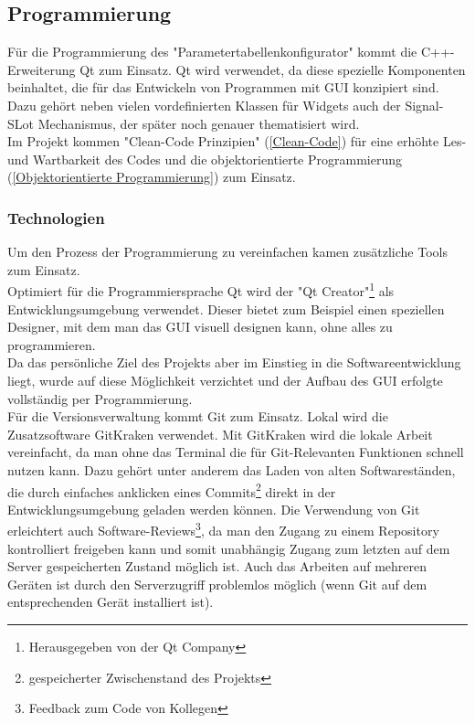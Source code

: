 \documentclass[a4paper,12pt,top=2.5cm,bottom=2.5cm, left=2.5cm, right=2.5cm, numbers=noenddot]{scrartcl}
\begin{document}
\subsection{Programmierung}
Für die Programmierung des "Parametertabellenkonfigurator" kommt die C++-Erweiterung Qt zum Einsatz. Qt wird verwendet, da diese spezielle Komponenten beinhaltet, die für das Entwickeln von Programmen mit GUI konzipiert sind. Dazu gehört neben vielen vordefinierten Klassen für Widgets auch der Signal-SLot Mechanismus, der später noch genauer thematisiert wird.\\
Im Projekt kommen "Clean-Code Prinzipien" (\ref{Clean-Code}) für eine erhöhte Les- und Wartbarkeit des Codes und die objektorientierte Programmierung (\ref{Objektorientierte Programmierung}) zum Einsatz.
\subsubsection{Technologien} 
Um den Prozess der Programmierung zu vereinfachen kamen zusätzliche Tools zum Einsatz. \\
Optimiert für die Programmiersprache Qt wird der "Qt Creator"\footnote{Herausgegeben von der Qt Company} als Entwicklungsumgebung verwendet. Dieser bietet zum Beispiel einen speziellen Designer, mit dem man das GUI visuell designen kann, ohne alles zu programmieren. \\
Da das persönliche Ziel des Projekts aber im Einstieg in die Softwareentwicklung liegt, wurde auf diese Möglichkeit verzichtet und der Aufbau des GUI erfolgte vollständig per Programmierung. \\
Für die Versionsverwaltung kommt Git zum Einsatz. Lokal wird die Zusatzsoftware GitKraken verwendet. Mit GitKraken wird die lokale Arbeit vereinfacht, da man ohne das Terminal die für Git-Relevanten Funktionen schnell nutzen kann. Dazu gehört unter anderem das Laden von alten Softwareständen, die durch einfaches anklicken eines Commits\footnote{gespeicherter Zwischenstand des Projekts} direkt in der Entwicklungsumgebung geladen werden können. 
Die Verwendung von Git erleichtert auch Software-Reviews\footnote{Feedback zum Code von Kollegen}, da man den Zugang zu einem Repository kontrolliert freigeben kann und somit unabhängig Zugang zum letzten auf dem Server gespeicherten Zustand möglich ist. Auch das Arbeiten auf mehreren Geräten ist durch den Serverzugriff problemlos möglich (wenn Git auf dem entsprechenden Gerät installiert ist).
\end{document}
